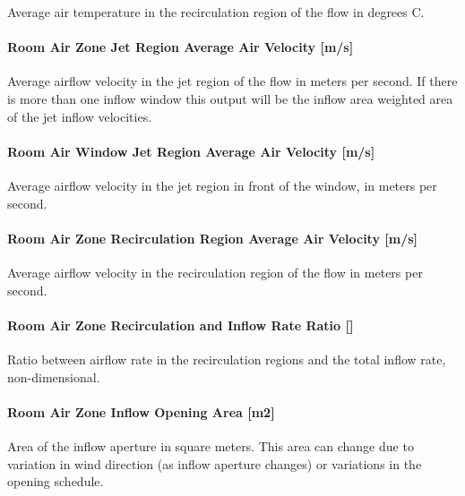 Average air temperature in the recirculation region of the flow in degrees C.

\paragraph{Room Air Zone Jet Region Average Air Velocity {[}m/s{]}}\label{room-air-zone-jet-region-average-air-velocity-ms}

Average airflow velocity in the jet region of the flow in meters per second. If there is more than one inflow window this output will be the inflow area weighted area of the jet inflow velocities.

\paragraph{Room Air Window Jet Region Average Air Velocity {[}m/s{]}}\label{room-air-window-jet-region-average-air-velocity-ms}

Average airflow velocity in the jet region in front of the window, in meters per second.

\paragraph{Room Air Zone Recirculation Region Average Air Velocity {[}m/s{]}}\label{room-air-zone-recirculation-region-average-air-velocity-ms}

Average airflow velocity in the recirculation region of the flow in meters per second.

\paragraph{\texorpdfstring{Room Air Zone Recirculation and Inflow Rate Ratio {[]}}{Room Air Zone Recirculation and Inflow Rate Ratio }}\label{room-air-zone-recirculation-and-inflow-rate-ratio}

Ratio between airflow rate in the recirculation regions and the total inflow rate, non-dimensional.

\paragraph{Room Air Zone Inflow Opening Area {[}m2{]}}\label{room-air-zone-inflow-opening-area-m2}

Area of the inflow aperture in square meters. This area can change due to variation in wind direction (as inflow aperture changes) or variations in the opening schedule.

